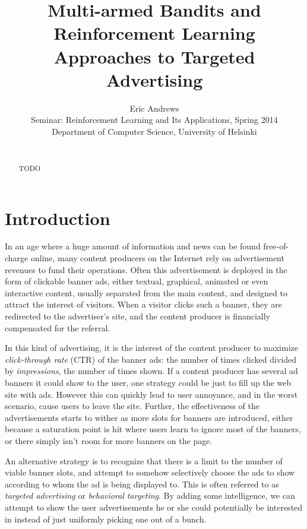 \documentclass{article} %
\title{Multi-armed Bandits and Reinforcement Learning Approaches to Targeted
Advertising}
\author{
Eric Andrews \\
Seminar: Reinforcement Learning and Its Applications, Spring 2014 \\
Department of Computer Science, University of Helsinki\\\\
}
\begin{document}
\maketitle

\begin{abstract}
  TODO
\end{abstract}

\section{Introduction}

In an age where a huge amount of information and news can be found
free-of-charge online, many content producers on the Internet rely on
advertisement revenues to fund their operations. Often this advertisement is
deployed in the form of clickable banner ads, either textual, graphical,
animated or even interactive content, usually separated from the main content,
and designed to attract the interest of visitors. When a visitor clicks such a
banner, they are redirected to the advertiser's site, and the content producer
is financially compensated for the referral.

In this kind of advertising, it is the interest of the content producer to
maximize \emph{click-through rate} (CTR) of the banner ads: the number of times
clicked divided by \emph{impressions}, the number of times shown. If a content
producer has several ad banners it could show to the user, one strategy could
be just to fill up the web site with ads. However this can quickly lead to user
annoyance, and in the worst scenario, cause users to leave the site. Further,
the effectiveness of the advertisements starts to wither as more slots for
banners are introduced, either because a saturation point is hit where users
learn to ignore most of the banners, or there simply isn't room for more
banners on the page.

An alternative strategy is to recognize that there is a limit to the number of
viable banner slots, and attempt to somehow selectively choose the ads to show
according to whom the ad is being displayed to. This is often referred to as
\emph{targeted advertising} or \emph{behavioral targeting}. By adding some
intelligence, we can attempt to show the user advertisements he or she could
potentially be interested in instead of just uniformly picking one out of a
bunch.


\end{document}

